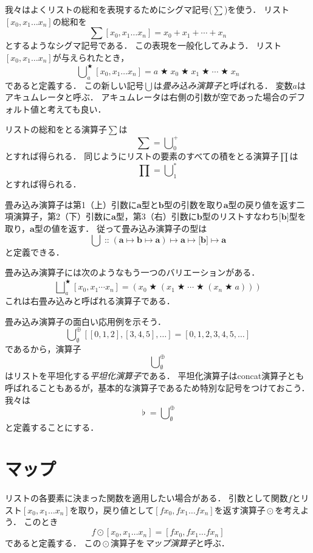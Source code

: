 \documentclass[twocolumn]{jsbook}
\newcommand{\hsklType}[1]{\textbf{#1}}
\DeclareMathOperator{\hsklConcat}{\flat}
\DeclareMathOperator{\hsklMap}{\odot}
\newcommand{\hsklAppend}{\oplus}
\newcommand{\hsklEmptyList}{\emptyset}
\newcommand{\hsklListType}[1]{\boldsymbol{[}#1\boldsymbol{]}}
\DeclareMathOperator{\mathAnyBinaryOperator}{\bigstar}
\DeclareMathOperator{\mathIn}{::}
\DeclareMathOperator*{\mathFold}{\bigcup}
\DeclareMathOperator*{\mathFoldRight}{\bigsqcup}
\DeclareMathOperator{\mathMapsTo}{\mapsto}
\newcommand{\mathMorphII}[3]{#1\mathMapsTo#2\mathMapsTo#3}
\newcommand{\mathMorphIII}[4]{#1\mathMapsTo#2\mathMapsTo#3\mathMapsTo#4}
\newcommand{\keyword}[1]{\emph{#1}}
\begin{document}
我々はよくリストの総和を表現するためにシグマ記号($\sum$)を使う．
リスト$[x_0,x_1\dots x_n]$の総和を$$\sum[x_0,x_1\dots x_n]=x_0+x_1+\dotsb+x_n$$とするようなシグマ記号である．
この表現を一般化してみよう．
リスト$[x_0,x_1\dots x_n]$が与えられたとき，$$\mathFold^{\mathAnyBinaryOperator}_{a}[x_0,x_1\dots x_n]=a\mathAnyBinaryOperator x_0\mathAnyBinaryOperator x_1\mathAnyBinaryOperator\dotsb\mathAnyBinaryOperator x_n$$であると定義する．
この新しい記号$\mathFold$は\keyword{畳み込み演算子}と呼ばれる．
変数$a$はアキュムレータと呼ぶ．
アキュムレータは右側の引数が空であった場合のデフォルト値と考えても良い．

リストの総和をとる演算子$\sum$は$$\sum=\mathFold^+_0$$とすれば得られる．
同じようにリストの要素のすべての積をとる演算子$\prod$は$$\prod=\mathFold^*_1$$とすれば得られる．

畳み込み演算子は第1（上）引数に$\hsklType{a}$型と$\hsklType{b}$型の引数を取り$\hsklType{a}$型の戻り値を返す二項演算子，第2（下）引数に$\hsklType{a}$型，第3（右）引数に$\hsklType{b}$型のリストすなわち$\hsklListType{\hsklType{b}}$型を取り，$\hsklType{a}$型の値を返す．
従って畳み込み演算子の型は$$\mathFold\mathIn\mathMorphIII{(\mathMorphII{\hsklType{a}}{\hsklType{b}}{\hsklType{a}})}{\hsklType{a}}{\hsklListType{\hsklType{b}}}{\hsklType{a}}$$と定義できる．

畳み込み演算子には次のようなもう一つのバリエーションがある．
$$\mathFoldRight^{\mathAnyBinaryOperator}_{a}[x_0,x_1\dotsb x_n]=\left(x_0\mathAnyBinaryOperator\left(x_1\mathAnyBinaryOperator\dotsb\mathAnyBinaryOperator\left(x_n\mathAnyBinaryOperator a\right)\right)\right)$$
これは右畳み込みと呼ばれる演算子である．

畳み込み演算子の面白い応用例を示そう．
$$\mathFold_\hsklEmptyList^\hsklAppend[[0,1,2],[3,4,5],\dots]=[0,1,2,3,4,5,\dots]$$
であるから，演算子$$\mathFold_\hsklEmptyList^\hsklAppend$$はリストを平坦化する\keyword{平坦化演算子}である．
平坦化演算子はconcat演算子とも呼ばれることもあるが，基本的な演算子であるため特別な記号をつけておこう．
我々は$$\hsklConcat=\mathFold_\hsklEmptyList^\hsklAppend$$と定義することにする．

\section{マップ}

リストの各要素に決まった関数を適用したい場合がある．
引数として関数$f$とリスト$[x_0,x_1\dots x_n]$を取り，戻り値として$[fx_0,fx_1\dots fx_n]$を返す演算子$\hsklMap$を考えよう．
このとき$$f\hsklMap[x_0,x_1\dots x_n]=[fx_0,fx_1\dots fx_n]$$であると定義する．
この$\hsklMap$演算子を\keyword{マップ演算子}と呼ぶ．
\end{document}
